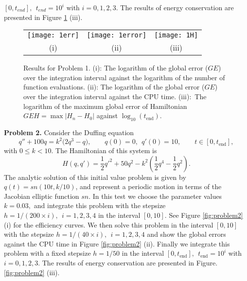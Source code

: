 \documentclass{article}
\begin{document}
$[0,t_{end}],\ \ t_{end}=10^{i}$ with $i=0,1,2,3$. The results of
energy conservation are presented in Figure \ref{fig:problem1}
(iii).
\begin{figure}[ptbh]
\centering\tabcolsep=1mm
\begin{tabular}
[c]{ccc}%
\texttt{[image: 1err]} &\texttt{[image: 1error]} &\texttt{[image: 1H]}\\
{\small (i)} & {\small (ii)} & {\small (iii)}%
\end{tabular}
\caption{Results for Problem 1. (i): The logarithm of the global
error ($GE$) over the integration interval against the logarithm of
the number of function evaluations.  (ii): The logarithm of the
global error ($GE$) over the integration interval against the CPU
time. (iii):\ The logarithm of the maximum global error of
Hamiltonian
$GEH=\max|H_{n}-H_{0}|$ against $\log_{10}(t_{\mathrm{end}})$.}%
\label{fig:problem1}%
\end{figure}



\noindent\vskip3mm \noindent\textbf{Problem 2.} Consider the Duffing
equation
\begin{equation*}
q''+100q=k^{2}\big(2q^{3}-q\big),  \qquad
q(0)=0,\ \ q'(0)=10,\qquad t\in[0,t_{\mathrm{end}}],\label{prob}%
\end{equation*}
with $0\leqslant k<10.$  The
  Hamiltonian of this system is
\begin{equation*}
H(q,q')=\frac{1}{2}q'^{2}+50q^{2}-k^{2}(\frac{1}{2}q^{4}-\frac{1}{2}q^{2}).
\end{equation*}
The analytic solution of this initial value problem is given by
$q(t)=sn(10t,k/10)$, and represent a periodic motion in terms of the
Jacobian elliptic function $sn$. In this test we choose the
parameter values $k=0.03,$ and integrate this problem with the
stepsize $h=1/(200\times i),\ \ i=1,2,3,4$ in the interval $[0,10]$.
See Figure \ref{fig:problem2} (i) for the  efficiency curves. We
then solve this problem in the interval $[0,10]$ with the stepsize
$h=1/(40\times i),\ \ i=1,2,3,4$ and show the global errors against
the CPU time in Figure \ref{fig:problem2} (ii). Finally we integrate
this problem with a fixed stepsize $h=1/50$ in the interval
$[0,t_{\mathrm{end}}],\ \ t_{\mathrm{end}}=10^{i}$ with $i=0,1,2,3$.
The results of energy conservation are presented in Figure.
\ref{fig:problem2} (iii).
\end{document}

